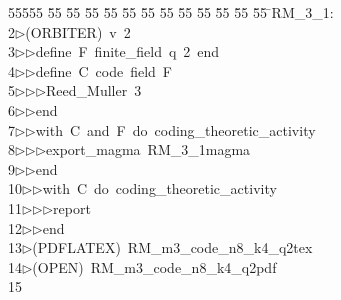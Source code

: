%
%
\begin{tabbing}
55555 \= 55 \= 55 \= 55 \= 55 \= 55 \= 55 \= 55 \= 55 \= 55 \= 55 \= 55 \= 55 \= \>RM\_3\_1:\\[0pt]
2\>$\triangleright$\>(ORBITER)\ v\ 2\ \\[0pt]
3\>$\triangleright$\>$\triangleright$\>define\ F\ finite\_field\ q\ 2\ end\ \\[0pt]
4\>$\triangleright$\>$\triangleright$\>define\ C\ code\ field\ F\ \\[0pt]
5\>$\triangleright$\>$\triangleright$\>$\triangleright$\>Reed\_Muller\ 3\ \\[0pt]
6\>$\triangleright$\>$\triangleright$\>end\ \\[0pt]
7\>$\triangleright$\>$\triangleright$\>with\ C\ and\ F\ do\ coding\_theoretic\_activity\ \\[0pt]
8\>$\triangleright$\>$\triangleright$\>$\triangleright$\>export\_magma\ RM\_3\_1magma\ \\[0pt]
9\>$\triangleright$\>$\triangleright$\>end\ \\[0pt]
10\>$\triangleright$\>$\triangleright$\>with\ C\ do\ coding\_theoretic\_activity\ \\[0pt]
11\>$\triangleright$\>$\triangleright$\>$\triangleright$\>report\ \\[0pt]
12\>$\triangleright$\>$\triangleright$\>end\\[0pt]
13\>$\triangleright$\>(PDFLATEX)\ RM\_m3\_code\_n8\_k4\_q2tex\\[0pt]
14\>$\triangleright$\>(OPEN)\ RM\_m3\_code\_n8\_k4\_q2pdf\\[0pt]
15\>\end{tabbing}
